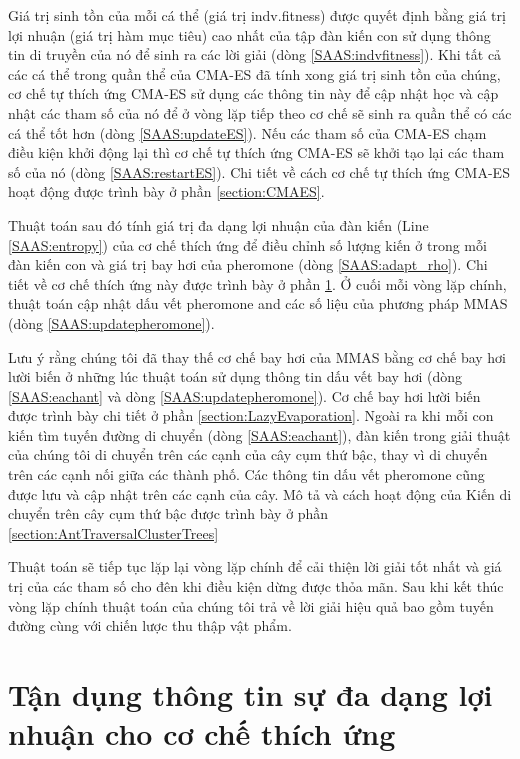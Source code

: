 Giá trị sinh tồn của mỗi cá thể (giá trị indv.fitness) được quyết định bằng giá trị lợi nhuận (giá trị hàm mục tiêu) cao nhất của tập đàn kiến con sử dụng thông tin di truyền của nó để sinh ra các lời giải (dòng \ref{SAAS:indvfitness}). Khi tất cả các cá thể trong quần thể của CMA-ES đã tính xong giá trị sinh tồn của chúng, cơ chế tự thích ứng CMA-ES sử dụng các thông tin này để cập nhật học và cập nhật các tham số của nó để ở vòng lặp tiếp theo cơ chế sẽ sinh ra quần thể có các cá thể tốt hơn (dòng \ref{SAAS:updateES}). Nếu các tham số của CMA-ES chạm điều kiện khởi động lại thì cơ chế tự thích ứng CMA-ES sẽ khởi tạo lại các tham số của nó (dòng \ref{SAAS:restartES}). Chi tiết về cách cơ chế tự thích ứng CMA-ES hoạt động được trình bày ở phần \ref{section:CMAES}. 

Thuật toán sau đó tính giá trị đa dạng lợi nhuận của đàn kiến (Line \ref{SAAS:entropy}) của cơ chế thích ứng để điều chỉnh số lượng kiến ở trong mỗi đàn kiến con và giá trị bay hơi của pheromone (dòng \ref{SAAS:adapt_rho}). Chi tiết về cơ chế thích ứng này được trình bày ở phần \ref{section:ProfitAdaptive}. Ở cuối mỗi vòng lặp chính, thuật toán cập nhật dấu vết pheromone and các số liệu của phương pháp MMAS (dòng \ref{SAAS:updatepheromone}).

Lưu ý rằng chúng tôi đã thay thế cơ chế bay hơi của MMAS bằng cơ chế bay hơi lười biến ở những lúc thuật toán sử dụng thông tin dấu vết bay hơi (dòng \ref{SAAS:eachant} và dòng \ref{SAAS:updatepheromone}). Cơ chế bay hơi lười biến được trình bày chi tiết ở phần \ref{section:LazyEvaporation}. Ngoài ra khi mỗi con kiến tìm tuyến đường di chuyển (dòng \ref{SAAS:eachant}), đàn kiến trong giải thuật của chúng tôi di chuyển trên các cạnh của cây cụm thứ bậc, thay vì di chuyển trên các cạnh nối giữa các thành phố. Các thông tin dấu vết pheromone cũng được lưu và cập nhật trên các cạnh của cây. Mô tả và cách hoạt động của Kiến di chuyển trên cây cụm thứ bậc được trình bày ở phần \ref{section:AntTraversalClusterTrees}

Thuật toán sẽ tiếp tục lặp lại vòng lặp chính để cải thiện lời giải tốt nhất và giá trị của các tham số cho đên khi điều kiện dừng được thỏa mãn. Sau khi kết thúc vòng lặp chính thuật toán của chúng tôi trả về lời giải hiệu quả bao gồm tuyến đường cùng với chiến lược thu thập vật phẩm.


\section{Tận dụng thông tin sự đa dạng lợi nhuận cho cơ chế thích ứng}\label{section:ProfitAdaptive}

